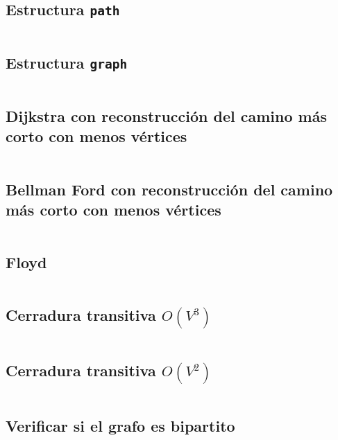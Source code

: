 \documentclass[11pt]{article}
\begin{document}
		\subsection{Estructura \texttt{path}}
		\inputminted[tabsize=2,breaklines,firstline=66,lastline=71,fontsize=\small]{c++}{graph.cpp}
		
		\subsection{Estructura \texttt{graph}}
		\inputminted[tabsize=2,breaklines,firstline=73,lastline=113,fontsize=\small]{c++}{graph.cpp}
		
		\subsection{Dijkstra con reconstrucción del camino más corto con menos vértices}
		\inputminted[tabsize=2,breaklines,firstline=115,lastline=142,fontsize=\small]{c++}{graph.cpp}
		
		\subsection{Bellman Ford con reconstrucción del camino más corto con menos vértices}
		\inputminted[tabsize=2,breaklines,firstline=144,lastline=178,fontsize=\small]{c++}{graph.cpp}
		
		\subsection{Floyd}
		\inputminted[tabsize=2,breaklines,firstline=180,lastline=188,fontsize=\small]{c++}{graph.cpp}
		
		\subsection{Cerradura transitiva $O(V^3)$}
		\inputminted[tabsize=2,breaklines,firstline=190,lastline=197,fontsize=\small]{c++}{graph.cpp}
		
		\subsection{Cerradura transitiva $O(V^2)$}
		\inputminted[tabsize=2,breaklines,firstline=199,lastline=214,fontsize=\small]{c++}{graph.cpp}
		
		\subsection{Verificar si el grafo es bipartito}
		\inputminted[tabsize=2,breaklines,firstline=216,lastline=238,fontsize=\small]{c++}{graph.cpp}
		
\end{document}
